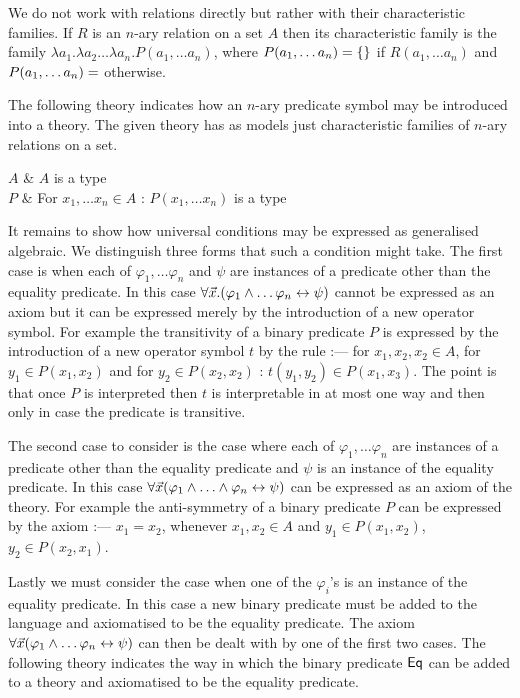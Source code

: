 We do not work with relations directly but rather with their characteristic families.
%
If $R$ is an $n$-ary relation on a set $A$ then its characteristic family is the family $\lambda a_1. \lambda a_2 \ldots \lambda a_n . P(a_1, \ldots a_n)$, where $P(a_1,\ldots a_n) = \{ \empty \}$ if $R(a_1,\ldots a_n)$ and $P(a_1,\ldots a_n) = \empty$ otherwise.

The following theory indicates how an $n$-ary predicate symbol may be introduced into a theory.
%
The given theory has as models just characteristic families of $n$-ary relations on a set.

\begin{theoryspec}
  $A$ & $A$ is a type \\
  $P$ & For $x_1, \ldots x_n \in A$ : $P(x_1,\ldots x_n)$ is a type \\
  \oneaxiom
\end{theoryspec}

It remains to show how universal conditions may be expressed as generalised algebraic.
%
We distinguish three forms that such a condition might take.
%
The first case is when each of $\varphi_1, \ldots \varphi_n$ and $\psi$ are instances of a predicate other than the equality predicate.
%
In this case $\forall \vec x.(\varphi_1 \land \ldots \varphi_n \leftrightarrow \psi)$ cannot be expressed as an axiom but it can be expressed merely by the introduction of a new operator symbol.
%
For example the transitivity of a binary predicate $P$ is expressed by the introduction of a new operator symbol $t$ by the rule :---  for $x_1,x_2,x_2 \in A$, for $y_1 \in P(x_1,x_2)$ and for $y_2 \in P(x_2,x_2)$ : $t(y_1,y_2) \in P(x_1,x_3)$.
%
The point is that once $P$ is interpreted then $t$ is interpretable in at most one way and then only in case the predicate is transitive.

The second case to consider is the case where each of $\varphi_1, \ldots \varphi_n$ are instances of a predicate other than the equality predicate and $\psi$ is an instance of the equality predicate.
%
In this case $\forall \vec x (\varphi_1 \land \ldots \land \varphi_n \leftrightarrow \psi)$ can be expressed as an axiom of the theory.
%
For example the anti-symmetry of a binary predicate $P$ can be expressed by the axiom :--- $x_1 = x_2$, whenever $x_1, x_2 \in A$ and $y_1 \in P(x_1,x_2)$, $y_2 \in P(x_2,x_1)$.

Lastly we must consider the case when one of the $\varphi_i$'s is an instance of the equality predicate.
%
In this case a new binary predicate must be added to the language and axiomatised to be the equality predicate.
%
The axiom $\forall \vec x (\varphi_1 \land \ldots \varphi_n \leftrightarrow \psi)$ can then be dealt with by one of the first two cases.
%
The following theory indicates the way in which the binary predicate $\mathsf{Eq}$ can be added to a theory and axiomatised to be the equality predicate.

